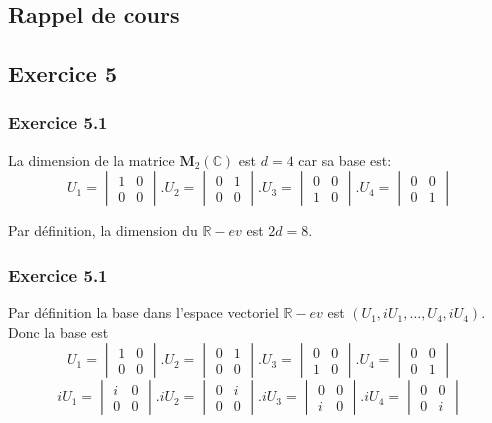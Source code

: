 \documentclass[]{book}
\theoremstyle{definition}
\newcommand{\bb}[1]{\mathbb{#1}}
\newcommand{\R}{\bb{R}}
\newcommand{\C}{\bb{C}}
\newcommand{\M}{\mathbf{M}}
\begin{document}
\subsection*{Rappel de cours}



\newpage


\subsection*{Exercice 5}
\subsubsection*{Exercice 5.1}
La dimension de la matrice $\M_2(\C)$ est $d=4$ car sa base est:
$$U_1 = \begin{vmatrix} 1 & 0 \\ 0 & 0 \end{vmatrix} . U_2 = \begin{vmatrix} 0 & 1 \\ 0 & 0 \end{vmatrix} . U_3 = \begin{vmatrix} 0 & 0 \\ 1 & 0 \end{vmatrix} . U_4 = \begin{vmatrix} 0 & 0 \\ 0 & 1 \end{vmatrix}$$

Par d\'efinition, la dimension du $\R-ev$ est $2d = 8$.

\subsubsection*{Exercice 5.1}
Par d\'efinition la base dans l'espace vectoriel $\R-ev$ est $(U_1, iU_1, \ldots, U_4, iU_4)$.
Donc la base est
$$U_1 = \begin{vmatrix} 1 & 0 \\ 0 & 0 \end{vmatrix} . U_2 = \begin{vmatrix} 0 & 1 \\ 0 & 0 \end{vmatrix} . U_3 = \begin{vmatrix} 0 & 0 \\ 1 & 0 \end{vmatrix} . U_4 = \begin{vmatrix} 0 & 0 \\ 0 & 1 \end{vmatrix}$$
$$iU_1 = \begin{vmatrix} i & 0 \\ 0 & 0 \end{vmatrix} . iU_2 = \begin{vmatrix} 0 & i \\ 0 & 0 \end{vmatrix} . iU_3 = \begin{vmatrix} 0 & 0 \\ i & 0 \end{vmatrix} . iU_4 = \begin{vmatrix} 0 & 0 \\ 0 & i \end{vmatrix}$$
\end{document}
